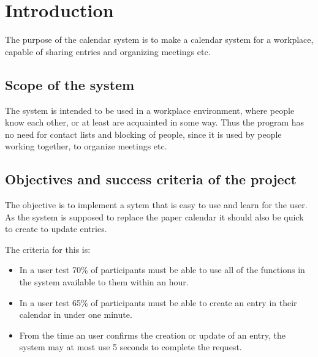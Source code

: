 \section{Introduction}
The purpose of the calendar system is to make a calendar system for a workplace, capable of sharing entries and organizing meetings etc.
\subsection{Scope of the system}
The system is intended to be used in a workplace environment, where people know each other, or at least are acquainted in some way. Thus the program has no need for contact lists and blocking of people, since it is used by people working together, to organize meetings etc.
\subsection{Objectives and success criteria of the project}
The objective is to implement a sytem that is easy to use and learn for the user. As the system is supposed to replace the paper calendar it should also be quick to create to update entries.

The criteria for this is:
\begin{itemize}
\item In a user test 70\% of participants must be able to use all of the functions in the system available to them within an hour.
\item In a user test 65\% of participants must be able to create an entry in their calendar in under one minute.
\item From the time an user confirms the creation or update of an entry, the system may at most use 5 seconds to complete the request.
\end{itemize}
